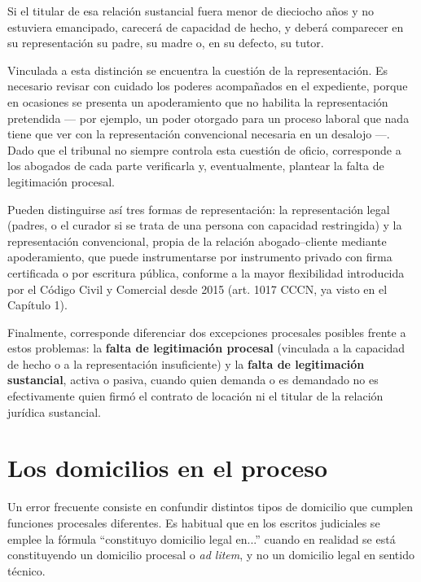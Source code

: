 \documentclass[12pt,oneside]{book}
\begin{document}
Si el titular de esa relación sustancial fuera menor de dieciocho años y no estuviera emancipado, carecerá de capacidad de hecho, y deberá comparecer en su representación su padre, su madre o, en su defecto, su tutor.

Vinculada a esta distinción se encuentra la cuestión de la representación. Es necesario revisar con cuidado los poderes acompañados en el expediente, porque en ocasiones se presenta un apoderamiento que no habilita la representación pretendida --- por ejemplo, un poder otorgado para un proceso laboral que nada tiene que ver con la representación convencional necesaria en un desalojo ---. Dado que el tribunal no siempre controla esta cuestión de oficio, corresponde a los abogados de cada parte verificarla y, eventualmente, plantear la falta de legitimación procesal.

Pueden distinguirse así tres formas de representación: la representación legal (padres, o el curador si se trata de una persona con capacidad restringida) y la representación convencional, propia de la relación abogado--cliente mediante apoderamiento, que puede instrumentarse por instrumento privado con firma certificada o por escritura pública, conforme a la mayor flexibilidad introducida por el Código Civil y Comercial desde 2015 (art. 1017 CCCN, ya visto en el Capítulo 1).

Finalmente, corresponde diferenciar dos excepciones procesales posibles frente a estos problemas: la \textbf{falta de legitimación procesal} (vinculada a la capacidad de hecho o a la representación insuficiente) y la \textbf{falta de legitimación sustancial}, activa o pasiva, cuando quien demanda o es demandado no es efectivamente quien firmó el contrato de locación ni el titular de la relación jurídica sustancial.

\section{Los domicilios en el proceso}

Un error frecuente consiste en confundir distintos tipos de domicilio que cumplen funciones procesales diferentes. Es habitual que en los escritos judiciales se emplee la fórmula ``constituyo domicilio legal en...'' cuando en realidad se está constituyendo un domicilio procesal o \emph{ad litem}, y no un domicilio legal en sentido técnico.
\end{document}
